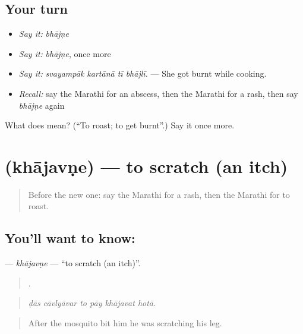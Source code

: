 \subsection*{Your turn}
\begin{itemize}
\raggedright
  \item \emph{Say it:} \emph{bhājṇe}
  \item \emph{Say it:} \emph{bhājṇe}, once more
  \item \emph{Say it:} \emph{svayampāk kartānā tī bhājlī.} — She got burnt while cooking.
  \item \emph{Recall:} say the Marathi for an abscess, then the Marathi for a rash, then say \emph{bhājṇe} again
\end{itemize}

\begin{tcolorbox}[breakable,colback=teal!4,colframe=teal!35!black,title={Before you move on}]
What does  mean? (\textquotedblleft{}To roast; to get burnt\textquotedblright{}.) Say it once more.
\end{tcolorbox}
\section[\texorpdfstring{\mr{खाजवणे} (khājavṇe)}{खाजवणे (khājavṇe)}]{ (khājavṇe) — to scratch (an itch)}

\label{lesson:MR-C487-khajavne}



\begin{quote}
Before the new one: say the Marathi for a rash, then the Marathi for to roast.
\end{quote}

\subsection*{You'll want to know: }
\textbf{} — \emph{khājavṇe} — \textquotedblleft{}to scratch (an itch)\textquotedblright{}.

\begin{quote}
     .
\end{quote}

\begin{quote}
\emph{ḍās cāvlyāvar to pāy khājavat hotā.}
\end{quote}

\begin{quote}
After the mosquito bit him he was scratching his leg.
\end{quote}

